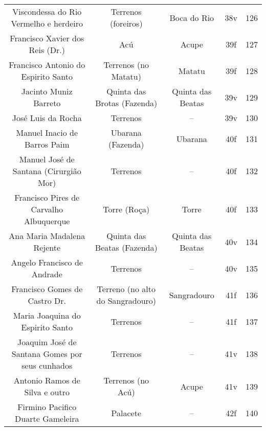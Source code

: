 \begin{table}[!htp]
{\begin{tiny}
\begin{tabular}{ccccc}
Viscondessa do Rio Vermelho e herdeiro						&Terrenos (foreiros)			&Boca do Rio				&38v			&126			&\\
Francisco Xavier dos Reis (Dr.)							&Acú					&Acupe					&39f			&127			&\\
Francisco Antonio do Espirito Santo						&Terrenos (no Matatu)			&Matatu					&39f			&128			&\\
Jacinto Muniz Barreto								&Quinta das Brotas (Fazenda)		&Quinta das Beatas			&39v			&129			&\\
José Luis da Rocha								&Terrenos				&--					&39v			&130			&\\
Manuel Inacio de Barros Paim							&Ubarana (Fazenda)			&Ubarana				&40f			&131			&\\
Manuel José de Santana (Cirurgião Mor)						&Terrenos				&--					&40f			&132			&\\
Francisco Pires de Carvalho Albuquerque						&Torre (Roça)				&Torre					&40f			&133			&\\
Ana Maria Madalena Rejente							&Quinta das Beatas (Fazenda)		&Quinta das Beatas			&40v			&134			&\\
Angelo Francisco de Andrade							&Terrenos				&--					&40v			&135			&\\
Francisco Gomes de Castro Dr.							&Terreno (no alto do Sangradouro)	&Sangradouro				&41f			&136			&\\
Maria Joaquina do Espirito Santo						&Terrenos				&--					&41f			&137			&\\
Joaquim José de Santana Gomes por seus cunhados					&Terrenos				&--					&41v			&138			&\\
Antonio Ramos de Silva e outro							&Terrenos (no Acú)			&Acupe					&41v			&139			&\\
Firmino Pacifico Duarte Gameleira						&Palacete				&--					&42f			&140			&\\
\bottomrule
\end{tabular} 
\end{tiny}
}{
}
\end{table}